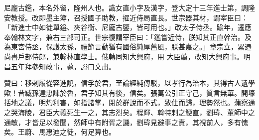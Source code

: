 \begin{pinyinscope}
 尼龐古鑑，本名外留，隆州人也。識女直小字及漢字，登大定十三年進士第，調隆安教授。改即墨主簿，召授國子助教，擢近侍局直長。世宗器其材，謂宰臣曰：「新進士中如徒單鎰、夾谷衡、尼龐古鑒，皆可用也。」改太子侍丞。踰年，遷應奉翰林文字，兼右三部司正。世宗復謂宰臣曰：「鑑嘗近侍，朕知其正直幹治。及為東宮侍丞，保護太孫，禮節言動猶有國俗純厚舊風，朕甚嘉之。」章宗立，累遷尚書戶部侍郎，兼翰林直學士。俄轉同知大興府，用
 大臣薦，改知大興府事。明昌五年拜參知政事，薨，謚曰文肅。



 贊曰：移剌履從容進說，信孚於君，至論經純傳駁，以孝行為治本，其得古人遺學歟！昔臧孫達忠諫於魯，君子知其有後，信矣。張萬公引正守己，質言無華。開壕括地之議，明灼利害，如指諸掌，閉於群說而不式，致仕而歸，理勢然也。蒲察通之哭海陵，君臣大義死生一之，其志烈矣。程輝、斡特剌之鯁直，劉瑋、董師中之通敏，才皆足以發聞，然師中有附胥之譏，劉瑋見避事之責，其視前人，多有愧矣。王蔚、馬惠迪之徒，何足算也。



\end{pinyinscope}